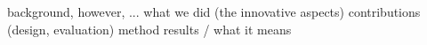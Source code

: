 background, however, ...
what we	did (the innovative aspects)
contributions (design, evaluation) method
results / what it means